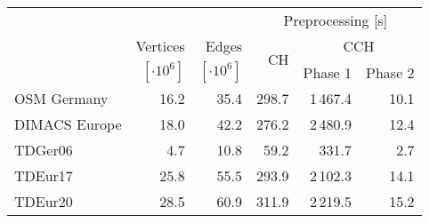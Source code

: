 \begin{tabular}{lrrrrr}
\toprule
 &                &                & \multicolumn{3}{c}{Preprocessing [s]} \\ \cmidrule(lr){4-6} & Vertices          & Edges          & \multirow{2}{*}{CH} & \multicolumn{2}{c}{CCH} \\ \cmidrule(lr){5-6} & $[\cdot 10^6]$ & $[\cdot 10^6]$ &                     & Phase 1 & Phase 2 \\
\midrule
OSM Germany   &       16.2 &       35.4 &                          298.7 &        1\,467.4 &          10.1 \\
DIMACS Europe &       18.0 &       42.2 &                          276.2 &        2\,480.9 &          12.4 \\
TDGer06       &        4.7 &       10.8 &                           59.2 &         331.7 &           2.7 \\
TDEur17       &       25.8 &       55.5 &                          293.9 &        2\,102.3 &          14.1 \\
TDEur20       &       28.5 &       60.9 &                          311.9 &        2\,219.5 &          15.2 \\
\bottomrule
\end{tabular}

